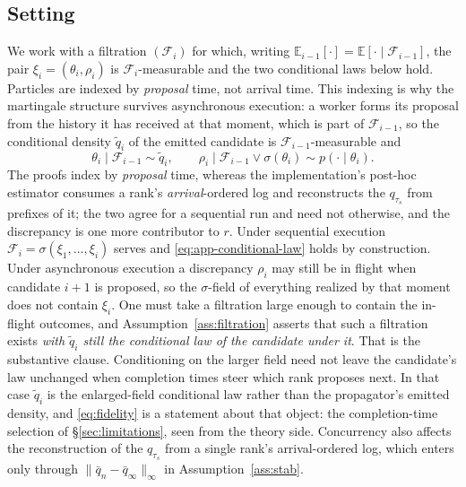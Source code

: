 \documentclass[10pt]{article}
\theoremstyle{plain}
\theoremstyle{definition}
\begin{document}
\subsection{Setting}\label{app:theory-setting}
We work with a filtration $(\mathcal{F}_i)$ for which, writing $\mathbb{E}_{i-1}[\cdot]=\mathbb{E}[\cdot\mid\mathcal{F}_{i-1}]$, the pair $\xi_i=(\theta_i,\rho_i)$ is $\mathcal{F}_i$-measurable and the two conditional laws below hold. Particles are indexed by \emph{proposal} time, not arrival time. This indexing is why the martingale structure survives asynchronous execution: a worker forms its proposal from the history it has received at that moment, which is part of $\mathcal{F}_{i-1}$, so the conditional density $\tilde q_i$ of the emitted candidate is $\mathcal{F}_{i-1}$-measurable and
\begin{equation}
\theta_i\mid\mathcal{F}_{i-1}\sim \tilde q_i,
\qquad
\rho_i\mid\mathcal{F}_{i-1}\vee\sigma(\theta_i)\sim p(\cdot\mid\theta_i).
\label{eq:app-conditional-law}
\end{equation}
The proofs index by \emph{proposal} time, whereas the implementation's post-hoc estimator consumes a rank's \emph{arrival}-ordered log and reconstructs the $q_{\tau_s}$ from prefixes of it; the two agree for a sequential run and need not otherwise, and the discrepancy is one more contributor to $r$. Under sequential execution $\mathcal{F}_i=\sigma(\xi_1,\dots,\xi_i)$ serves and \eqref{eq:app-conditional-law} holds by construction. Under asynchronous execution a discrepancy $\rho_i$ may still be in flight when candidate $i+1$ is proposed, so the $\sigma$-field of everything realized by that moment does not contain $\xi_i$. One must take a filtration large enough to contain the in-flight outcomes, and Assumption~\ref{ass:filtration} asserts that such a filtration exists \emph{with $\tilde q_i$ still the conditional law of the candidate under it}. That is the substantive clause. Conditioning on the larger field need not leave the candidate's law unchanged when completion times steer which rank proposes next. In that case $\tilde q_i$ is the enlarged-field conditional law rather than the propagator's emitted density, and \eqref{eq:fidelity} is a statement about that object: the completion-time selection of \S\ref{sec:limitations}, seen from the theory side. Concurrency also affects the reconstruction of the $q_{\tau_s}$ from a single rank's arrival-ordered log, which enters only through $\|\bar q_n-\bar q_\infty\|_\infty$ in Assumption~\ref{ass:stab}.
\end{document}
